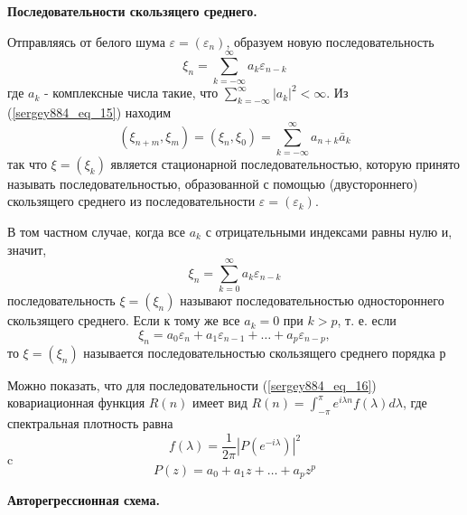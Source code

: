 \textbf{Последовательности скользяцего среднего.}

Отправляясь от белого шума $\varepsilon=\left(\varepsilon_n\right)$, образуем новую последовательность
\begin{equation}\label{sergey884_eq_15}
\xi_n=\sum_{k=-\infty}^{\infty} a_k \varepsilon_{n-k}
\end{equation}
где $a_k$ - комплексные числа такие, что $\sum_{k=-\infty}^{\infty}\left|a_k\right|^2<\infty$.
Из (\ref{sergey884_eq_15}) находим
$$
\left(\xi_{n+m}, \xi_m\right)=\left(\xi_n, \xi_0\right)=\sum_{k=-\infty}^{\infty} a_{n+k} \bar{a}_k
$$
так что $\xi=\left(\xi_k\right)$ является стационарной последовательностью, которую принято называть последовательностью, образованной с помощью (двустороннего) скользящего среднего из последовательности $\varepsilon=\left(\varepsilon_k\right)$.

В том частном случае, когда все $a_k$ с отрицательными индексами равны нулю и, значит,
$$
\xi_n=\sum_{k=0}^{\infty} a_k \varepsilon_{n-k}
$$
последовательность $\xi=\left(\xi_n\right)$ называют последовательностью одностороннего скользящего среднего. Если к тому же все $a_k=0$ при $k>p$, т. е. если
\begin{equation}\label{sergey884_eq_16}
\xi_n=a_0 \varepsilon_n+a_1 \varepsilon_{n-1}+\ldots+a_p \varepsilon_{n-p},
\end{equation}
то $\xi=\left(\xi_n\right)$ называется последовательностью скользящего среднего порядка $р$

Можно показать, что для последовательности (\ref{sergey884_eq_16}) ковариационная функция $R(n)$ имеет вид $R(n)=\int_{-\pi}^\pi e^{i \lambda n} f(\lambda) d \lambda$, где спектральная плотность равна
\begin{equation}\label{sergey884_eq_17}
f(\lambda)=\frac{1}{2 \pi}\left|P\left(e^{-i \lambda}\right)\right|^2
\end{equation}
$\mathrm{c}$
$$
P(z)=a_0+a_1 z+\ldots+a_p z^p
$$\newline

\textbf{Авторегрессионная схема.}

